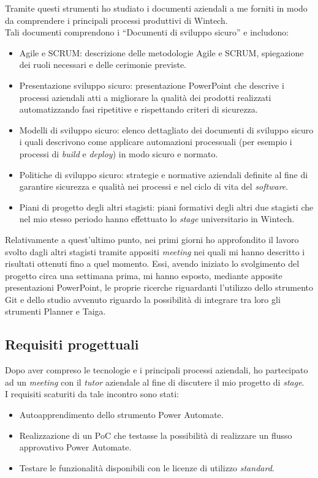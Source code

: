 Tramite questi strumenti ho studiato i documenti aziendali a me forniti in modo da comprendere i principali processi produttivi di Wintech.\\ 
Tali documenti comprendono i “Documenti di sviluppo sicuro” e includono:
\begin{itemize}
    \item Agile e SCRUM: descrizione delle metodologie Agile e SCRUM, spiegazione dei ruoli necessari e delle cerimonie previste. 
    \item Presentazione sviluppo sicuro: presentazione PowerPoint che descrive i processi aziendali atti a migliorare la qualità dei prodotti realizzati automatizzando fasi ripetitive e rispettando criteri di sicurezza. 
    \item Modelli di sviluppo sicuro: elenco dettagliato dei documenti di sviluppo sicuro i quali descrivono come applicare automazioni processuali (per esempio i processi di \emph{build} e \emph{deploy}) in modo sicuro e normato. 
    \item Politiche di sviluppo sicuro: strategie e normative aziendali definite al fine di garantire sicurezza e qualità nei processi e nel ciclo di vita del \emph{software}. 
    \item Piani di progetto degli altri stagisti: piani formativi degli altri due stagisti che nel mio stesso periodo hanno effettuato lo \emph{stage} universitario in Wintech. 
\end{itemize}
Relativamente a quest'ultimo punto, nei primi giorni ho approfondito il lavoro svolto dagli altri stagisti tramite appositi \emph{meeting} nei quali mi hanno descritto i risultati ottenuti fino a quel momento. Essi, avendo iniziato lo svolgimento del progetto circa una settimana prima, mi hanno esposto, mediante apposite presentazioni PowerPoint, le proprie ricerche riguardanti l'utilizzo dello strumento Git e dello studio avvenuto riguardo la possibilità di integrare tra loro gli strumenti Planner e Taiga. 

\subsection{Requisiti progettuali}
Dopo aver compreso le tecnologie e i principali processi aziendali, ho partecipato ad un \emph{meeting} con il \emph{tutor} aziendale al fine di discutere il mio progetto di \emph{stage}.\\
I requisiti scaturiti da tale incontro sono stati: 
\begin{itemize}
    \item Autoapprendimento dello strumento Power Automate.
    \item Realizzazione di un PoC che testasse la possibilità di realizzare un flusso approvativo Power Automate. 
    \item Testare le funzionalità disponibili con le licenze di utilizzo \emph{standard}. 
\end{itemize}

